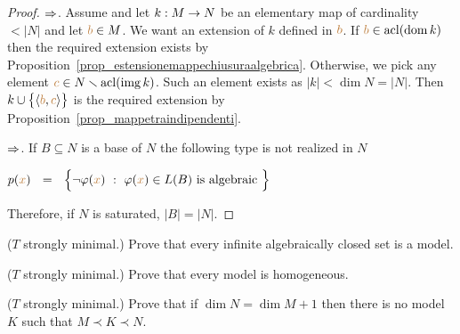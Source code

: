 \begin{proof}
$\Rightarrow$.
Assume  and let $k:M\rightarrow N$ be an elementary map of cardinality $<|N|$ and let ${\color{brown} b}\in M$.
We want an extension of $k$ defined in ${\color{brown} b}$.
If ${\color{brown} b}\in\mathop{\rm acl}(\mathop{\rm dom} k)$ then the required extension exists by Proposition~\ref{prop_estensionemappechiusuraalgebrica}.
Otherwise, we pick any element ${\color{brown} c}\in N\smallsetminus\mathop{\rm acl}(\mathop{\rm img} k)$. Such an element exists as $|k|<\dim N=|N|$.
Then $k\cup\big\{\langle{\color{brown}b},{\color{brown} c}\rangle\big\}$ is the required extension by Proposition~\ref{prop_mappetraindipendenti}.

$\Rightarrow$.
If $B\subseteq N$ is a base of $N$ the following type is not realized in $N$

\hfil $p({\color{brown} x})\ \ =\ \ \Big\{\neg\varphi({\color{brown} x})\ :\ \varphi({\color{brown} x})\in L(B)\textrm{ is algebraic }\Big\}$

Therefore, if $N$ is saturated, $|B|=|N|$.
\end{proof}

\begin{exercise}\label{ex_infinite_acl}
($T$ strongly minimal.) Prove that every infinite algebraically closed set is a model.\QED
\end{exercise}

\begin{exercise}
($T$ strongly minimal.) Prove that every model is homogeneous.\QED 
\end{exercise}

\begin{exercise}
($T$ strongly minimal.) Prove that if $\dim N=\dim M+1$ then there is no model $K$ such that $M\prec K\prec N$.\QED 
\end{exercise}




% 

